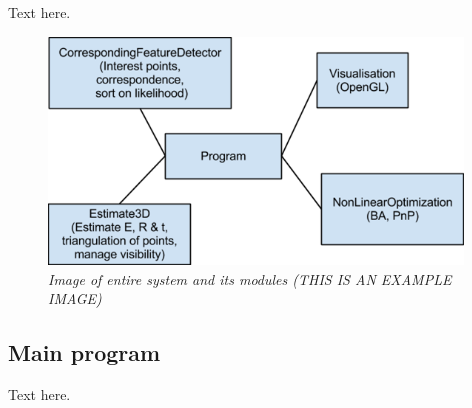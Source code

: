 Text here.

\begin{figure}[htb]
	\centering
	\includegraphics[width=110mm]{images/example2.png}
	\caption[This text ends up at the table of figures]{\textit{Image of entire system and its modules (THIS IS AN EXAMPLE IMAGE) }}
	\label{fig:block_overview2_fig}  %
\end{figure}

\subsection{Main program}
Text here.


